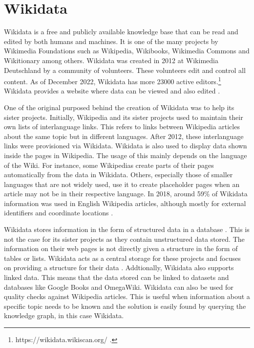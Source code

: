 \section{Wikidata}
Wikidata is a free and publicly available knowledge base that can be read and edited by both humans and machines. It is one of the many projects by Wikimedia Foundations such as Wikipedia, Wikibooks, Wikimedia Commons and Wikitionary among others.  Wikidata was created in 2012 at Wikimedia Deutschland by a community of volunteers. These volunteers edit and control all content. As of December 2022, Wikidata has more 23000 active editors.\footnote{https://wikidata.wikiscan.org/ .} Wikidata provides a website where data can be viewed and also edited \cite{Foundationa}.

One of the original purposed behind the creation of Wikidata was to help its sister projects. Initially, Wikipedia and its sister projects used to maintain their own lists of interlanguage links. This refers to links between Wikipedia articles about the same topic but in different languages. After 2012, these interlanguage links were provisioned via Wikidata. Wikidata is also used to display data shown inside the pages in Wikipedia. The usage of this mainly depends on the language of the Wiki. For instance, some Wikipedias create parts of their pages automatically from the data in Wikidata. Others, especially those of smaller languages that are not widely used, use it to create placeholder pages when an article may not be in their respective language. In 2018, around 59\% of Wikidata information was used in English Wikipedia articles, although mostly for external identifiers and coordinate locations \cite{Wikipedia2017}. 

Wikidata stores information in the form of structured data in a database \cite{Tharani2021}. This is not the case for its sister projects as they contain unstructured data stored. The information on their web pages is not directly given a structure in the form of tables or lists. Wikidata acts as a central storage for these projects and focuses on providing a structure for their data \cite{Wikidata2014}. Addtionally, Wikidata also supports linked data. This means that the data stored can be linked to datasets and databases like Google Books and OmegaWiki. Wikidata can also be used for quality checks against Wikipedia articles. This is useful when information about a specific topic needs to be known and the solution is easily found by querying the knowledge graph, in this case Wikidata.


